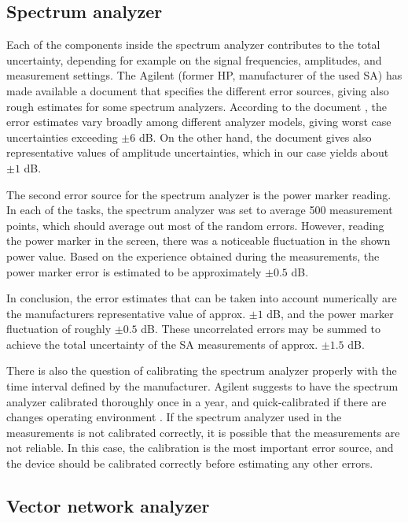 \documentclass[a4paper, 12pt]{article}
\begin{document}
\subsection{Spectrum analyzer}

Each of the components inside the spectrum analyzer contributes to the total uncertainty, 
depending for example on the signal frequencies, amplitudes, and measurement settings. 
The Agilent (former HP, manufacturer of the used SA) has made available a document that 
specifies the different error sources, giving also rough estimates for some spectrum 
analyzers. According to the document \cite{sa}, the error estimates vary broadly among 
different analyzer models, giving worst case uncertainties exceeding $\pm 6$ dB. On the 
other hand, the document gives also representative values of amplitude uncertainties, 
which in our case yields about $\pm 1$ dB.

The second error source for the spectrum analyzer is the power marker reading. In 
each of the tasks, the spectrum analyzer was set to average 500 measurement points, 
which should average out most of the random errors. However, reading the power marker 
in the screen, there was a noticeable fluctuation in the shown power value. Based on the 
experience obtained during the measurements, the power marker error is estimated to be 
approximately $\pm 0.5$ dB.

In conclusion, the error estimates that can be taken into account numerically are 
the manufacturers representative value of approx. $\pm 1$ dB, and the power marker 
fluctuation of roughly $\pm 0.5$ dB. These uncorrelated errors may be summed to 
achieve the total uncertainty of the SA measurements of approx. $\pm 1.5$ dB. 

There is also the question of calibrating the spectrum analyzer properly with 
the time interval defined by the manufacturer. Agilent suggests to have the spectrum 
analyzer calibrated thoroughly once in a year, and quick-calibrated if there are 
changes operating environment \cite{sa2}. If the spectrum analyzer used in the 
measurements is not calibrated correctly, it is possible that the measurements are 
not reliable. In this case, the calibration is the most important error source, and 
the device should be calibrated correctly before estimating any other errors.


\subsection{Vector network analyzer}
\end{document}

